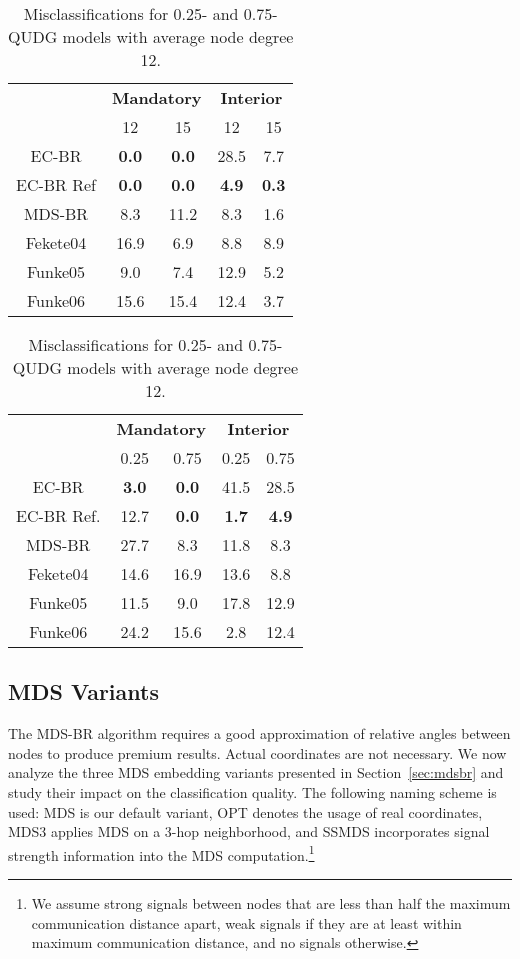 \documentclass{llncs}
\begin{document}
\begin{table}[t]
\begin{minipage}[t]{0.48\columnwidth}
\setlength\tabcolsep{5pt}
\centering
\caption{Misclassifications for the 0.75-QUDG model and different average node degrees.}\label{tab::qudg1}
\begin{tabular}{c||cc||cc}
& \multicolumn{2}{c||}{\bfseries Mandatory}& \multicolumn{2}{c}{\bfseries Interior} \\
& 12 & 15 & 12 & 15 \\
\hline
EC-BR & \bfseries 0.0 & \bfseries 0.0 & 28.5 & 7.7  \\
EC-BR Ref & \bfseries 0.0 & \bfseries 0.0 & \bfseries 4.9 & \bfseries 0.3  \\
MDS-BR & 8.3 & 11.2 & 8.3 & 1.6  \\
\hline
Fekete04 & 16.9 & 6.9 & 8.8 & 8.9  \\
Funke05 & 9.0 & 7.4 & 12.9 & 5.2  \\
Funke06 & 15.6 & 15.4 & 12.4 & 3.7
\end{tabular}
\end{minipage}
\hfill
\begin{minipage}[t]{0.48\columnwidth}
\setlength\tabcolsep{5pt}
\centering
\caption{Misclassifications for 0.25- and 0.75-QUDG models with average node degree 12.}\label{tab::qudg2}
\begin{tabular}{c||cc||cc}
& \multicolumn{2}{c||}{\bfseries Mandatory}& \multicolumn{2}{c}{\bfseries Interior} \\
& 0.25 & 0.75 & 0.25 & 0.75 \\
\hline
EC-BR & \bfseries 3.0 & \bfseries 0.0 & 41.5 & 28.5  \\
EC-BR Ref. & 12.7 & \bfseries 0.0 & \bfseries 1.7 & \bfseries 4.9  \\
MDS-BR & 27.7 & 8.3 & 11.8 & 8.3  \\
\hline
Fekete04 & 14.6 & 16.9 & 13.6 & 8.8  \\
Funke05 & 11.5 & 9.0 & 17.8 & 12.9  \\
Funke06 & 24.2 & 15.6 & 2.8 & 12.4
\end{tabular}
\end{minipage}
\end{table}


\subsection{MDS Variants}\label{ssec:variants}
The MDS-BR algorithm requires a good approximation of relative angles between nodes to produce premium results.
Actual coordinates are not necessary.
We now analyze the three MDS embedding variants presented in Section~\ref{sec:mdsbr} and study their impact on the classification quality.
The following naming scheme is used: MDS is our default variant, OPT denotes the usage of real coordinates, MDS3 applies MDS on a $3$-hop neighborhood, and SSMDS incorporates signal strength information into the MDS computation.\footnote{We assume strong signals between nodes that are less than half the maximum communication distance apart, weak signals if they are at least within maximum communication distance, and no signals otherwise.}
\end{document}
